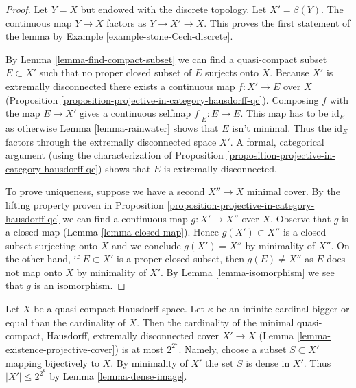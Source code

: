 \begin{proof}
Let $Y = X$ but endowed with the discrete topology. Let $X' = \beta(Y)$.
The continuous map $Y \to X$ factors as $Y \to X' \to X$. This
proves the first statement of the lemma by
Example \ref{example-stone-Cech-discrete}.

\medskip\noindent
By Lemma \ref{lemma-find-compact-subset} we can find a quasi-compact subset
$E \subset X'$ such that no proper closed subset of $E$ surjects onto $X$.
Because $X'$ is extremally disconnected there exists a continuous map
$f : X' \to E$ over $X$
(Proposition \ref{proposition-projective-in-category-hausdorff-qc}).
Composing $f$ with the map $E \to X'$ gives a continuous selfmap
$f|_E : E \to E$. This map has to be $\text{id}_E$ as otherwise
Lemma \ref{lemma-rainwater} shows that $E$ isn't minimal.
Thus the $\text{id}_E$ factors through the extremally disconnected
space $X'$. A formal, categorical argument (using the characterization of
Proposition \ref{proposition-projective-in-category-hausdorff-qc})
shows that $E$ is extremally disconnected.

\medskip\noindent
To prove uniqueness, suppose we have a second $X'' \to X$
minimal cover. By the lifting property proven in
Proposition \ref{proposition-projective-in-category-hausdorff-qc}
we can find a continuous map $g : X' \to X''$ over $X$.
Observe that $g$ is a closed map (Lemma \ref{lemma-closed-map}).
Hence $g(X') \subset X''$ is a closed subset surjecting onto $X$
and we conclude $g(X') = X''$ by minimality of $X''$.
On the other hand, if $E \subset X'$ is a proper closed subset,
then $g(E) \not = X''$ as $E$ does not map onto $X$ by minimality
of $X'$. By Lemma \ref{lemma-isomorphism} we see that $g$ is an isomorphism.
\end{proof}

\begin{remark}
\label{remark-size-projective-cover}
Let $X$ be a quasi-compact Hausdorff space. Let $\kappa$ be an infinite
cardinal bigger or equal than the cardinality of $X$. Then the cardinality
of the minimal quasi-compact, Hausdorff, extremally disconnected cover
$X' \to X$ (Lemma \ref{lemma-existence-projective-cover})
is at most $2^{2^\kappa}$. Namely, choose a subset $S \subset X'$
mapping bijectively to $X$. By minimality of $X'$ the set $S$ is dense
in $X'$. Thus $|X'| \leq 2^{2^\kappa}$ by Lemma \ref{lemma-dense-image}.
\end{remark}







